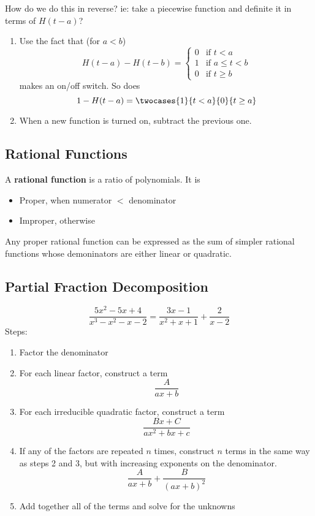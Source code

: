 \documentclass[12pt]{article}
\begin{document}
How do we do this in reverse? ie: take a piecewise function and definite it in terms of $H(t-a)$?
\begin{enumerate}
\item Use the fact that (for $a < b$) \[ H(t-a) - H(t-b) = \begin{cases}0 & \text{if } t < a\\1 & \text{if } a \leq t < b\\0 & \text{if } t \geq b\end{cases} \] makes an on/off switch. So does \[ 1 - H(t-a) = \twocases{1}{t < a}{0}{t \geq a} \]
\item When a new function is turned on, subtract the previous one.
\end{enumerate}

\subsection*{Rational Functions}
A {\bf rational function} is a ratio of polynomials. It is
\begin{itemize}
\item Proper, when numerator $<$ denominator
\item Improper, otherwise
\end{itemize}

Any proper rational function can be expressed as the sum of simpler rational functions whose demoninators are either linear or quadratic.

\subsection*{Partial Fraction Decomposition}
\[ \frac{5x^2-5x+4}{x^3-x^2-x-2} = \frac{3x-1}{x^2+x+1} + \frac{2}{x-2} \]
Steps:
\begin{enumerate}
\item Factor the denominator
\item For each linear factor, construct a term \[ \frac{A}{ax+b} \]
\item For each irreducible quadratic factor, construct a term \[ \frac{Bx+C}{ax^2+bx+c} \]
\item If any of the factors are repeated $n$ times, construct $n$ terms in the same way as steps 2 and 3, but with increasing exponents on the denominator. \[ \frac{A}{ax+b} + \frac{B}{(ax+b)^2} \]
\item Add together all of the terms and solve for the unknowns
\end{enumerate}
\end{document}
